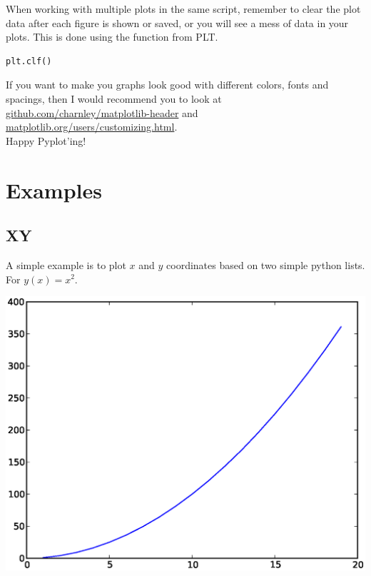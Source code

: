 \documentclass{article}
\begin{document}
When working with multiple plots in the same script, remember to clear the plot data after each figure is shown or saved, or you will see a mess of data in your plots. This is done using the  function from PLT.

\begin{lstlisting}
plt.clf()
\end{lstlisting}

If you want to make you graphs look good with different colors, fonts and spacings, then I would recommend you to look at 
\href{http://github.com/charnley/matplotlib-header}{github.com/charnley/matplotlib-header}
and
\href{http://matplotlib.org/users/customizing.html}{matplotlib.org/users/customizing.html}.\\

Happy Pyplot'ing!\\



\newpage
\section{Examples}

\subsection{XY}

A simple example is to plot $x$ and $y$ coordinates based on two simple python lists.
For $y(x) = x^2$.

\begin{multicols}{2}

    

\columnbreak

    \includegraphics[width=1.0\linewidth]{py/figure_xy.eps}

\end{multicols}
\end{document}
